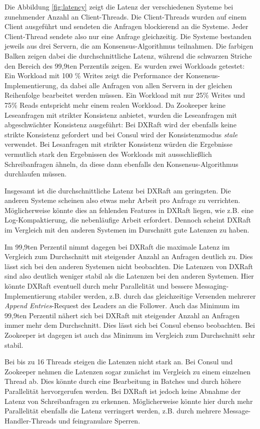 Die Abbildung \ref{fig:latency} zeigt die Latenz der verschiedenen Systeme bei zunehmender Anzahl an Client-Threads. Die Client-Threads wurden auf einem Client ausgeführt und sendeten die Anfragen blockierend an die Systeme. Jeder Client-Thread sendete also nur eine Anfrage gleichzeitig. Die Systeme bestanden jeweils aus drei Servern, die am Konsensus-Algorithmus teilnahmen. Die farbigen Balken zeigen dabei die durchschnittliche Latenz, während die schwarzen Striche den Bereich des 99,9ten Perzentils zeigen. Es wurden zwei Workloads getestet: Ein Workload mit 100 \% Writes zeigt die Performance der Konsensus-Implementierung, da dabei alle Anfragen von allen Servern in der gleichen Reihenfolge bearbeitet werden müssen. Ein Workload mit nur 25\% Writes und 75\% Reads entspricht mehr einem realen Workload. Da Zookeeper keine Leseanfragen mit strikter Konsistenz anbietet, wurden die Leseanfragen mit abgeschwächter Konsistenz ausgeführt: Bei DXRaft wird der ebenfalls keine strikte Konsistenz gefordert und bei Consul wird der Konsistenzmodus \textit{stale} verwendet. Bei Lesanfragen mit strikter Konsistenz würden die Ergebnisse vermutlich stark den Ergebnissen des Workloads mit aussschließlich Schreibanfragen ähneln, da diese dann ebenfalls den Konsensus-Algorithmus durchlaufen müssen.

Insgesamt ist die durchschnittliche Latenz bei DXRaft am geringsten. Die anderen Systeme scheinen also etwas mehr Arbeit pro Anfrage zu verrichten. Möglicherweise könnte dies an fehlenden Features in DXRaft liegen, wie z.B. eine Log-Kompaktierung, die nebenläufige Arbeit erfordert. Dennoch scheint DXRaft im Vergleich mit den anderen Systemen im Durschnitt gute Latenzen zu haben. 

Im 99,9ten Perzentil nimmt dagegen bei DXRaft die maximale Latenz im Vergleich zum Durchschnitt mit steigender Anzahl an Anfragen deutlich zu. Dies lässt sich bei den anderen Systemen nicht beobachten. Die Latenzen von DXRaft sind also deutlich weniger stabil als die Latenzen bei den anderen Systemen. Hier könnte DXRaft eventuell durch mehr Parallelität und bessere Messaging-Implementierung stabiler werden, z.B. durch das gleichzeitige Versenden mehrerer \textit{Append Entries}-Request des Leaders an die Follower. Auch das Minimum im 99,9ten Perzentil nähert sich bei DXRaft mit steigender Anzahl an Anfragen immer mehr dem Durchschnitt. Dies lässt sich bei Consul ebenso beobachten. Bei Zookeeper ist dagegen ist auch das Minimum im Vergleich zum Durchschnitt sehr stabil.

Bei bis zu 16 Threads steigen die Latenzen nicht stark an. Bei Consul und Zookeeper nehmen die Latenzen sogar zunächst im Vergleich zu einem einzelnen Thread ab. Dies könnte durch eine Bearbeitung in Batches und durch höhere Parallelität hervorgerufen werden. Bei DXRaft ist jedoch keine Abnahme der Latenz von Schreibanfragen zu erkennen. Möglicherweise könnte hier durch mehr Parallelität ebenfalls die Latenz verringert werden, z.B. durch mehrere Message-Handler-Threads und feingranulare Sperren.

